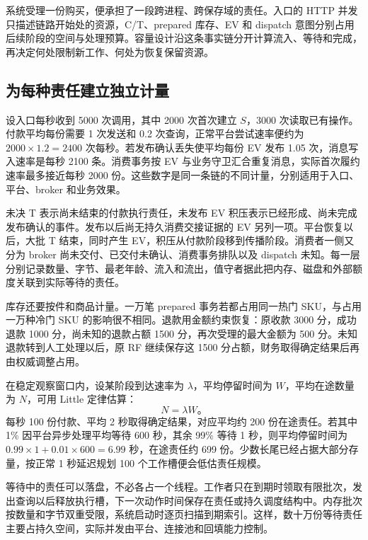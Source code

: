 系统受理一份购买，便承担了一段跨进程、跨保存域的责任。入口的 HTTP 并发只描述链路开始处的资源，C/T、prepared 库存、EV 和 dispatch 意图分别占用后续阶段的空间与处理预算。容量设计沿这条事实链分开计算流入、等待和完成，再决定何处限制新工作、何处为恢复保留资源。

\subsection{为每种责任建立独立计量}

设入口每秒收到 5000 次调用，其中 2000 次首次建立 $S$，3000 次读取已有操作。付款平均每份需要 1 次发送和 0.2 次查询，正常平台尝试速率便约为 $2000\times1.2=2400$ 次每秒。若发布确认丢失使平均每份 EV 发布 1.05 次，消息写入速率是每秒 2100 条。消费事务按 EV 与业务守卫汇合重复消息，实际首次履约速率最多接近每秒 2000 份。这些数字是同一条链的不同计量，分别适用于入口、平台、broker 和业务效果。


未决 T 表示尚未结束的付款执行责任，未发布 EV 积压表示已经形成、尚未完成发布确认的事件。发布以后尚无持久消费交接证据的 EV 另列一项。平台恢复以后，大批 T 结束，同时产生 EV，积压从付款阶段移到传播阶段。消费者一侧又分为 broker 尚未交付、已交付未确认、消费事务排队以及 dispatch 未知。每一层分别记录数量、字节、最老年龄、流入和流出，值守者据此把内存、磁盘和外部额度关联到实际等待的责任。

库存还要按件和商品计量。一万笔 prepared 事务若都占用同一热门 SKU，与占用一万种冷门 SKU 的影响很不相同。退款用金额约束恢复：原收款 3000 分，成功退款 1000 分，尚未知的退款占额 1500 分，再次受理的最大金额为 500 分。未知退款转到人工处理以后，原 RF 继续保存这 1500 分占额，财务取得确定结果后再由权威调整占用。

在稳定观察窗口内，设某阶段到达速率为 $\lambda$，平均停留时间为 $W$，平均在途数量为 $N$，可用 Little 定律估算：
\[
N=\lambda W\text{。}
\]
每秒 100 份付款、平均 2 秒取得确定结果，对应平均约 200 份在途责任。若其中 1\% 因平台异步处理平均等待 600 秒，其余 99\% 等待 1 秒，则平均停留时间为 $0.99\times1+0.01\times600=6.99$ 秒，在途责任约 699 份。少数长尾已经占据大部分存量，按正常 1 秒延迟规划 100 个工作槽便会低估责任规模。

等待中的责任可以落盘，不必各占一个线程。工作者只在到期时领取有限批次，发出查询以后释放执行槽，下一次动作时间保存在责任或持久调度结构中。内存批次按数量和字节双重受限，系统启动时逐页扫描到期索引。这样，数十万份等待责任主要占持久空间，实际并发由平台、连接池和回填能力控制。

